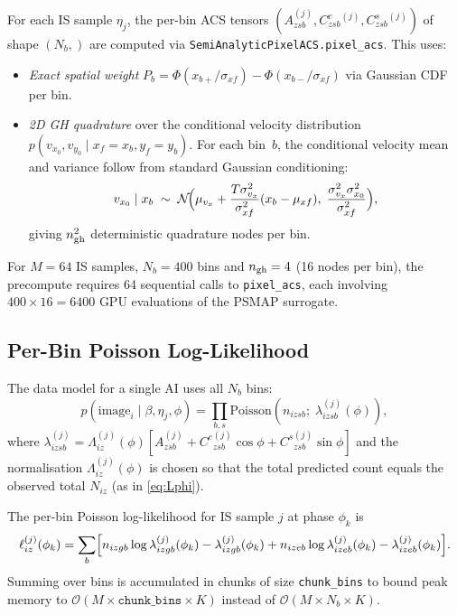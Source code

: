 \documentclass[11pt,a4paper]{article}
\begin{document}
For each IS sample $\eta_j$, the per-bin ACS tensors
$(A_{zsb}^{(j)}, C^c_{zsb}{}^{(j)}, C^s_{zsb}{}^{(j)})$ of shape
$(N_b,)$ are computed via \texttt{SemiAnalyticPixelACS.pixel\_acs}.
This uses:
\begin{itemize}
  \item \emph{Exact spatial weight} $P_b = \Phi(x_{b+}/\sigma_{xf}) -
        \Phi(x_{b-}/\sigma_{xf})$ via Gaussian CDF per bin.
  \item \emph{2D GH quadrature} over the conditional velocity
        distribution $p(v_{x_0},v_{y_0} \mid x_f=x_b, y_f=y_b)$.
        For each bin~$b$, the conditional velocity mean and variance
        follow from standard Gaussian conditioning:
        \begin{equation}
          v_{x_0} \mid x_b
          \;\sim\;
          \mathcal{N}\!\Bigl(
            \mu_{v_x} + \frac{T\sigma^2_{v_x}}{\sigma^2_{xf}}(x_b - \mu_{xf}),\;
            \frac{\sigma^2_{v_x}\sigma^2_{x_0}}{\sigma^2_{xf}}
          \Bigr),
        \end{equation}
        giving $n_{\rm gh}^2$ deterministic quadrature nodes per bin.
\end{itemize}
For $M=64$ IS samples, $N_b=400$ bins and $n_{\rm gh}=4$ (16 nodes per
bin), the precompute requires 64 sequential calls to
\texttt{pixel\_acs}, each involving $400\times16 = 6400$ GPU
evaluations of the PSMAP surrogate.

\subsection{Per-Bin Poisson Log-Likelihood}

The data model for a single AI uses all $N_b$ bins:
\begin{equation}
  p(\text{image}_i \mid \beta, \eta_j, \phi)
  = \prod_{b,s} \mathrm{Poisson}(n_{izsb};\;\lambda_{izsb}^{(j)}(\phi)),
  \label{eq:poisson_per_bin}
\end{equation}
where $\lambda_{izsb}^{(j)} = \Lambda_{iz}^{(j)}(\phi)
[A_{zsb}^{(j)} + C^c{}_{zsb}^{(j)}\cos\phi + C^s{}_{zsb}^{(j)}\sin\phi]$
and the normalisation $\Lambda_{iz}^{(j)}(\phi)$ is chosen so that the
total predicted count equals the observed total $N_{iz}$ (as in
\eqref{eq:Lphi}).

The per-bin Poisson log-likelihood for IS sample $j$ at phase $\phi_k$ is
\begin{equation}
  \ell_{iz}^{(j)}(\phi_k)
  = \sum_b \Bigl[
      n_{izgb}\log\lambda_{izgb}^{(j)}(\phi_k)
      - \lambda_{izgb}^{(j)}(\phi_k)
      + n_{izeb}\log\lambda_{izeb}^{(j)}(\phi_k)
      - \lambda_{izeb}^{(j)}(\phi_k)
    \Bigr].
  \label{eq:ll_per_bin_is}
\end{equation}
Summing over bins is accumulated in chunks of size \texttt{chunk\_bins}
to bound peak memory to $\mathcal{O}(M \times \texttt{chunk\_bins} \times K)$
instead of $\mathcal{O}(M \times N_b \times K)$.
\end{document}
